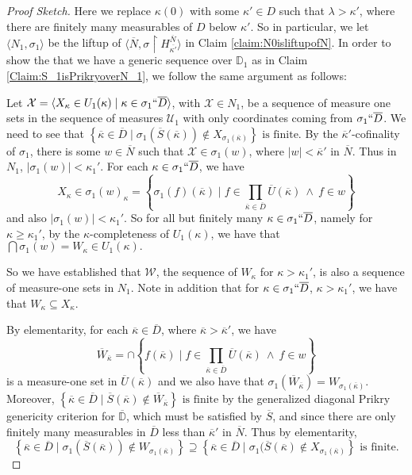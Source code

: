 \documentclass{amsart}
\theoremstyle{definition}
\theoremstyle{remark}
\newcommand{\D}{\mathbb{D}}
\newcommand{\N}{{\overline{N}}}
\renewcommand{\S}{{\overline{S}}}
\newcommand{\U}{\mathcal{U}}
\newcommand{\st}{\; | \;}
\newcommand{\set}[2]{\left\{#1\st #2 \right\}}
\newcommand{\seq}[2]{\langle #1 \st #2 \rangle}
\newcommand{\rest}{\mathbin{\upharpoonright}}
\begin{document}
\begin{proof}[Proof Sketch]
Here we replace $\kappa(0)$ with some $\kappa' \in D$ such that $\lambda > \kappa' $, where there are finitely many measurables of $D$ below $\kappa'$. 
So in particular, we let $\langle N_1, \sigma_1 \rangle$ be the liftup of $\langle \N, \sigma \rest H_{\overline{\kappa'}}^\N\rangle$ in Claim \ref{claim:N0isliftupofN}. In order to show the that we have a generic sequence over $\D_1$ as in Claim \ref{Claim:S_1isPrikryoverN_1}, we follow the same argument as follows:

Let $\mathcal X = \seq{ X_\kappa \in U_1(\kappa) }{ \kappa \in \sigma_1``\overline D }$, with $\mathcal X \in N_1$, be a sequence of measure one sets in the sequence of measures $\U_1$ with only coordinates coming from $\sigma_1``\overline D$.
We need to see that 
$\set{ \overline \kappa \in \overline D}{\sigma_1(\S(\overline \kappa)) \notin X_{\sigma_1(\overline \kappa)} }  \text{ is finite.}$
By the $\overline{\kappa}'$-cofinality of $\sigma_1$, there is some $w \in \N$ such that $\mathcal X \in \sigma_1(w)$, where $|w| < \overline{\kappa}'$ in $\N$. Thus in $N_1$, $|\sigma_1(w)| < \kappa_1'$. 
For each $\kappa \in \sigma_1``\overline D$, we have $$X_\kappa \in \sigma_1(w)_\kappa = \set{\sigma_1(f)(\overline \kappa) }{ f \in \prod_{\overline \kappa \in \overline D} \overline U(\overline \kappa) \ \land \ f \in w }$$ and also $|\sigma_1(w)|<\kappa_1'.$ So for all but finitely many $\kappa \in \sigma_1``\overline D$, namely for $\kappa \geq \kappa_1'$, by the $\kappa$-completeness of $U_1(\kappa)$, we have that $\bigcap \sigma_1(w)=W_\kappa \in U_1(\kappa).$

So we have established that $\mathcal W$, the sequence of $W_\kappa$ for $\kappa>\kappa_1'$, is also a sequence of measure-one sets in $N_1$. Note in addition that for $\kappa \in \sigma_1``\overline D$, $\kappa> \kappa_1'$, we have that $W_\kappa \subseteq X_\kappa$. 

By elementarity, for each $\overline \kappa \in \overline D$, where $\overline \kappa > \overline \kappa'$, we have $$\overline W_{\overline \kappa} =\cap \set{f(\overline \kappa) }{ f \in \textstyle\prod_{\overline \kappa \in \overline D} \overline U(\overline \kappa) \ \land \ f \in w }$$ is a measure-one set in $\overline U(\overline \kappa)$ and we also have that $\sigma_1(\overline W_{\overline \kappa}) = W_{\sigma_1(\overline \kappa)}$. Moreover, 
	$\set{\overline \kappa \in \overline D}{\overline S(\overline \kappa) \notin \overline W_{\overline \kappa}} \text{ is finite}$ by the generalized diagonal Prikry genericity criterion for $\overline{\D}$, which must be satisfied by $\overline S$, and since there are only finitely many measurables in $\overline D$ less than $\overline \kappa'$ in $\N$.
Thus by elementarity,
	$$\set{ \overline \kappa \in \overline D }{ \sigma_1(\overline S(\overline \kappa)) \notin W_{\sigma_1(\overline \kappa)} } \supseteq \set{ \overline \kappa \in \overline D }{ \sigma_1(\overline S(\overline \kappa) \notin X_{\sigma_1(\overline \kappa)}} \text{ is finite.}$$


\end{proof}
\end{document}
